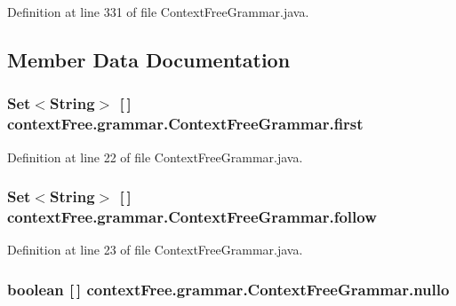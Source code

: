 Definition at line 331 of file Context\-Free\-Grammar.\-java.



\subsection{Member Data Documentation}
\hypertarget{classcontext_free_1_1grammar_1_1_context_free_grammar_a670c2e35761e57add4c2f3ae29131325}{
\subsubsection[{first}]{\setlength{\rightskip}{0pt plus 5cm}Set$<$String$>$ \mbox{[}$\,$\mbox{]} {\bf context\-Free.\-grammar.\-Context\-Free\-Grammar.\-first}}}\label{classcontext_free_1_1grammar_1_1_context_free_grammar_a670c2e35761e57add4c2f3ae29131325}


Definition at line 22 of file Context\-Free\-Grammar.\-java.

\hypertarget{classcontext_free_1_1grammar_1_1_context_free_grammar_a56137caac336fd26652d4c21252fd95f}{
\subsubsection[{follow}]{\setlength{\rightskip}{0pt plus 5cm}Set$<$String$>$ \mbox{[}$\,$\mbox{]} {\bf context\-Free.\-grammar.\-Context\-Free\-Grammar.\-follow}}}\label{classcontext_free_1_1grammar_1_1_context_free_grammar_a56137caac336fd26652d4c21252fd95f}


Definition at line 23 of file Context\-Free\-Grammar.\-java.

\hypertarget{classcontext_free_1_1grammar_1_1_context_free_grammar_a5a9f69817c82b19b21adb85326d60f3b}{
\subsubsection[{nullo}]{\setlength{\rightskip}{0pt plus 5cm}boolean \mbox{[}$\,$\mbox{]} {\bf context\-Free.\-grammar.\-Context\-Free\-Grammar.\-nullo}}}\label{classcontext_free_1_1grammar_1_1_context_free_grammar_a5a9f69817c82b19b21adb85326d60f3b}


